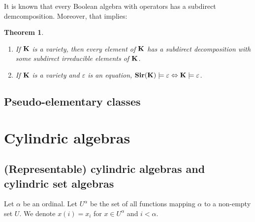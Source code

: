 \documentclass[a4paper]{article}
\theoremstyle{defin}
\theoremstyle{theorem}
\newtheorem{theorem}{Theorem}
\theoremstyle{prop}
\theoremstyle{lemma}
\theoremstyle{ex}
\theoremstyle{col}
\begin{document}
It is known that every Boolean algebra with operators has a subdirect demcomposition. Moreover, that implies:
\begin{theorem}
$ $

  \begin{enumerate}
  \item If ${\bf K}$ is a variety, then every element of ${\bf K}$ has a subdirect decomposition with some subdirect irreducible elements of
  ${\bf K}$.
  \item If ${\bf K}$ is a variety and $\varepsilon$ is an equation,
  ${\bf Sir}({\bf K}) \models \varepsilon \Leftrightarrow {\bf K} \models \varepsilon$.
\end{enumerate}
\end{theorem}

\subsection{Pseudo-elementary classes}

\section{Cylindric algebras}

\subsection{(Representable) cylindric algebras and cylindric set algebras}

Let $\alpha$ be an ordinal. Let $U^{\alpha}$ be the set of all functions mapping $\alpha$ to a non-empty set $U$. We denote $x(i) = x_i$ for
$x \in U^{\alpha}$ and $i < \alpha$.
\end{document}
